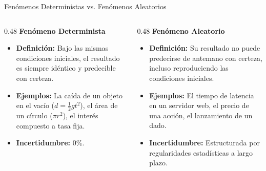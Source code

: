 \begin{frame}{Fenómenos Deterministas vs. Fenómenos Aleatorios}
  \begin{columns}[T]
    \begin{column}{0.48\textwidth}
      {\large \color{TecAzulOscuro}\textbf{Fenómeno Determinista}}
      \vspace{0.3em}
      \begin{itemize}
        \item \textbf{Definición:} Bajo las mismas condiciones iniciales, el resultado es siempre idéntico y predecible con certeza. \pause
        \item \textbf{Ejemplos:} La caída de un objeto en el vacío ($d = \frac{1}{2}gt^2$), el área de un círculo ($\pi r^2$), el interés compuesto a tasa fija. \pause
        \item \textbf{Incertidumbre:} $0\%$.
      \end{itemize}
    \end{column}
    
    \begin{column}{0.48\textwidth}
      {\large \color{TecRojo}\textbf{Fenómeno Aleatorio}}
      \vspace{0.3em}
      \begin{itemize}
        \item \textbf{Definición:} Su resultado no puede predecirse de antemano con certeza, incluso reproduciendo las condiciones iniciales. \pause
        \item \textbf{Ejemplos:} El tiempo de latencia en un servidor web, el precio de una acción, el lanzamiento de un dado. \pause
        \item \textbf{Incertidumbre:} Estructurada por regularidades estadísticas a largo plazo.
      \end{itemize}
    \end{column}
  \end{columns}
\end{frame}

